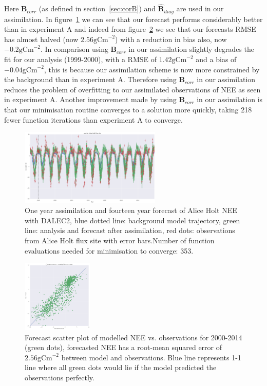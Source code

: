 \documentclass[11pt]{article}
\begin{document}
Here $\textbf{B}_{corr}$ (as defined in section~\ref{sec:corB}) and $\hat{\textbf{R}}_{diag}$ are used in our assimilation. In figure~\ref{fig:4dvaredcBR} we can see that our forecast performs considerably better than in experiment A and indeed from figure~\ref{fig:forecastscatedcBR} we see that our forecasts RMSE has almost halved (now $2.56 \text{gCm}^{-2}$) with a reduction in bias also, now $-0.2 \text{gCm}^{-2}$. In comparison using $\textbf{B}_{corr}$ in our assimilation slightly degrades the fit for our analysis (1999-2000), with a RMSE of $1.42 \text{gCm}^{-2}$ and a bias of $-0.04 \text{gCm}^{-2}$, this is because our assimilation scheme is now more constrained by the background than in experiment A. Therefore using $\textbf{B}_{corr}$ in our assimilation reduces the problem of overfitting to our assimilated observations of NEE as seen in experiment A. Another improvement made by using $\textbf{B}_{corr}$ in our assimilation is that our minimisation routine converges to a solution more quickly, taking 218 fewer function iterations than experiment A to converge. 

\begin{figure}[ht]
    \centering
    \includegraphics[width=0.6\textwidth]{b_edcNone_4dvar.png}
    \caption{One year assimilation and fourteen year forecast of Alice Holt NEE with DALEC2, blue dotted line: background model trajectory, green line: analysis and forecast after assimilation, red dots: observations from Alice Holt flux site with error bars.Number of function evaluations needed for minimisation to converge: 353.}
    \label{fig:4dvaredcBR}
\end{figure}

\begin{figure}[ht]
    \centering
    \includegraphics[width=0.3\textwidth]{b_edcNone_forecast_scatter.png}
    \caption{Forecast scatter plot of modelled NEE vs. observations for 2000-2014 (green dots), forecasted NEE has a root-mean squared error of $2.56 \text{gCm}^{-2}$ between model and observations. Blue line represents 1-1 line where all green dots would lie if the model predicted the observations perfectly.}
    \label{fig:forecastscatedcBR}
\end{figure}
\end{document}
